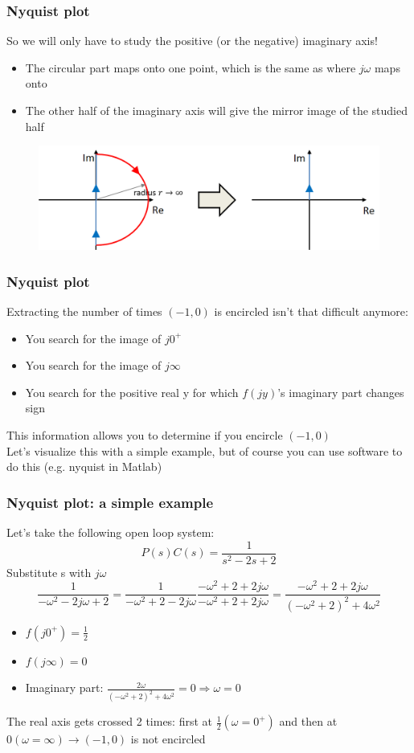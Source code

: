 \begin{frame}
	\frametitle{Nyquist plot}
	So we will only have to study the positive (or the negative) imaginary axis!\\
	\begin{itemize}
		\item The circular part maps onto one point, which is the same as where $j\omega$ maps onto
		\item The other half of the imaginary axis will give the mirror image of the studied half
	\end{itemize}	
	\begin{figure}
		\includegraphics[width=1\linewidth]{plot}
	\end{figure}
\end{frame}

\begin{frame}
	\frametitle{Nyquist plot}
	\vspace{-6ex}
	Extracting the number of times $(-1,0)$ is encircled isn't that difficult anymore:
	\begin{itemize}
		\item You search for the image of $j0^+$
		\item You search for the image of $j\infty$
		\item You search for the positive real y for which $f(jy)$'s imaginary part changes sign
	\end{itemize}
	This information allows you to determine if you encircle $(-1,0)$\\
	Let's visualize this with a simple example, but of course you can use software to do this (e.g. nyquist in Matlab)
\end{frame}

\begin{frame}
	\frametitle{Nyquist plot: a simple example}
	Let's take the following open loop system: $$P(s)C(s)=\frac{1}{s^2-2s+2}$$
	Substitute s with $j\omega$  $$\frac{1}{-\omega^2-2j\omega+2}=\frac{1}{-\omega^2+2-2j\omega}\frac{-\omega^2+2+2j\omega}{-\omega^2+2+2j\omega}=\frac{-\omega^2+2+2j\omega}{(-\omega^2+2)^2+4\omega^2}$$
	\vspace{-2ex}
	\begin{itemize}
		\item $f(j0^+)=\frac{1}{2}$
		\item $f(j\infty)=0$
		\item Imaginary part: $\frac{2\omega}{(-\omega^2+2)^2+4\omega^2}=0\Rightarrow\omega=0$
	\end{itemize} 
	The real axis gets crossed 2 times: first at $\frac{1}{2} (\omega=0^+)$ and then at $0 (\omega=\infty) \rightarrow (-1,0)$ is not encircled
\end{frame}


